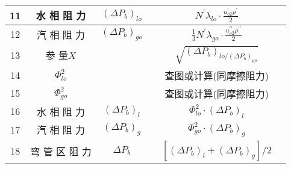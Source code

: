 \begin{table}[H]
{\begin{tabular}{|c|c|c|c|c|c|}
            11   & 水 相 阻 力          & $ (\Delta P_b)_{lo} $ &       & $ N^{\prime} \lambda_{l o} \cdot \frac{u_{o 2}^{\prime} \rho^{\prime}}{2} $                           &      \\ \hline
            12   & 汽 相 阻 力          & $ (\Delta P_b)_{go} $ &       & $ \frac{1}{3} N^{\prime} \lambda_{g o} \cdot \frac{u_{o 2}^{\prime \prime} \rho^{\prime \prime}}{2} $ &      \\ \hline
            13   & 参 量$ X $           &                       &       & $ \sqrt{(\Delta P_b)_{lo / (\Delta P_b)_{go}}} $                                                      &      \\ \hline
            14   & $ \Phi_{lo}^{2} $    &                       &       & 查图或计算(同摩擦阻力)                                                                                &      \\ \hline
            15   & $ \Phi_{go}^{2} $    &                       &       & 查图或计算(同摩擦阻力)                                                                                &      \\ \hline
            16   & 水 相 阻 力          & $ (\Delta P_b)_{l} $  &       & $ \Phi_{lo}^{2} \cdot (\Delta P_b)_{l} $                                                              &      \\ \hline
            17   & 汽 相 阻 力          & $ (\Delta P_b)_{g} $  &       & $ \Phi_{go}^{2} \cdot (\Delta P_b)_{g} $                                                              &      \\ \hline
            18   & 弯 管 区 阻 力       & $ \Delta P_b $        &       & $ [(\Delta P_b)_{l} + (\Delta P_b)_{g}] / 2 $                                                         &      \\ \hline
        \end{tabular}
    }
\end{table}

